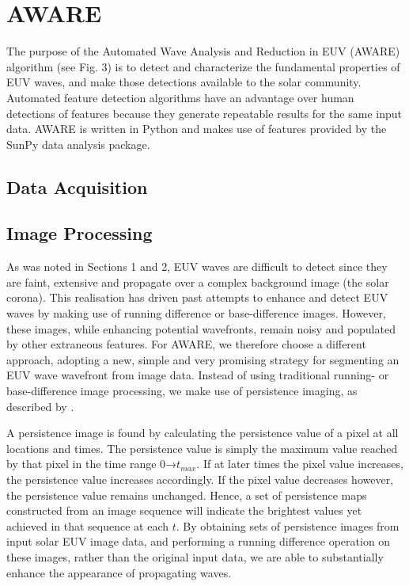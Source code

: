 \section{AWARE}\label{sec:aware}

The purpose of the Automated Wave Analysis and Reduction in EUV (AWARE) algorithm (see Fig. 3) is to detect and characterize the fundamental properties of EUV waves, and make those detections available to the solar community. Automated feature detection algorithms have an advantage over human detections of features because they generate repeatable results for the same input data. AWARE is written in Python and makes use of features provided by the SunPy data analysis package.


\subsection{Data Acquisition}


\subsection{Image Processing}

As was noted in Sections 1 and 2, EUV waves are difficult to detect since they are faint, extensive and propagate over a complex background image (the solar corona). This realisation has driven past attempts to enhance and detect EUV waves by making use of running difference or base-difference images. However, these images, while enhancing potential wavefronts, remain noisy and populated by other extraneous features. For AWARE, we therefore choose a different approach, adopting a new, simple and very promising strategy for segmenting an EUV wave wavefront from image data. Instead of using traditional running- or base-difference image processing, we make use of persistence imaging, as described by \citet{2014AAS...22421838T}. 

A persistence image is found by calculating the persistence value of a pixel at all locations and times.  The persistence value is simply the maximum value reached by that pixel in the time range 0→$t_{max}$.  If at later times the pixel value increases, the persistence value increases accordingly. If the pixel value decreases however, the persistence value remains unchanged. Hence, a set of persistence maps constructed from an image sequence will indicate the brightest values yet achieved in that sequence at each $t$. By obtaining sets of persistence images from input solar EUV image data, and performing a running difference operation on these images, rather than the original input data, we are able to substantially enhance the appearance of propagating waves.

